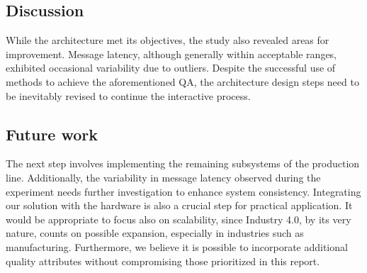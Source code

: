 \documentclass[conference]{IEEEtran}
\begin{document}
\subsection{Discussion}
While the architecture met its objectives, the study also revealed areas for improvement. Message latency, although generally within acceptable ranges, exhibited occasional variability due to outliers. Despite the successful use of methods to achieve the aforementioned QA, the architecture design steps need to be inevitably revised to continue the interactive process. 

\subsection{Future work}
The next step involves implementing the remaining subsystems of the production line. Additionally, the variability in message latency observed during the experiment needs further investigation to enhance system consistency. Integrating our solution with the hardware is also a crucial step for practical application. It would be appropriate to focus also on scalability, since Industry 4.0, by its very nature, counts on possible expansion, especially in industries such as manufacturing. Furthermore, we believe it is possible to incorporate additional quality attributes without compromising those prioritized in this report. 
\end{document}
